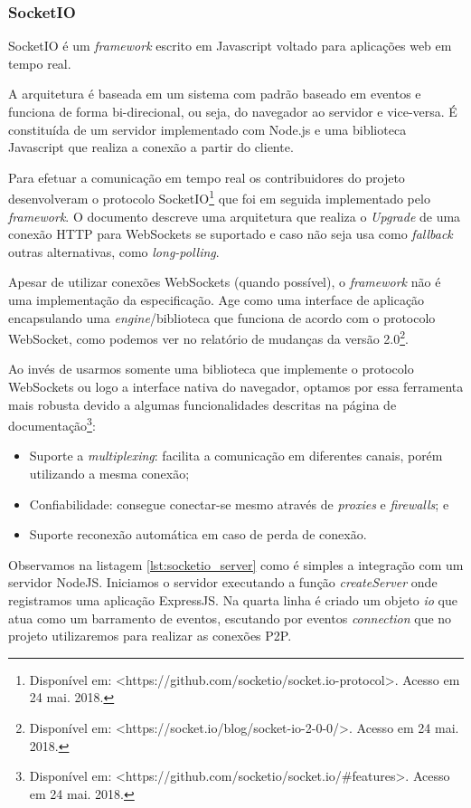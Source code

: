 \subsubsection{SocketIO}

SocketIO é um \textit{framework} escrito em Javascript voltado para aplicações web em tempo real.

A arquitetura é baseada em um sistema com padrão baseado em eventos e funciona de forma bi-direcional, ou seja, do navegador ao servidor e vice-versa. É constituída de um servidor implementado com Node.js e uma biblioteca Javascript que realiza a conexão a partir do cliente.

Para efetuar a comunicação em tempo real os contribuidores do projeto desenvolveram o protocolo SocketIO\footnote{Disponível em: <https://github.com/socketio/socket.io-protocol>. Acesso em 24 mai. 2018.} que foi em seguida implementado pelo \textit{framework}. O documento descreve uma arquitetura que realiza o \textit{Upgrade} de uma conexão HTTP para WebSockets se suportado e caso não seja usa como \textit{fallback} outras alternativas, como \textit{long-polling}.

Apesar de utilizar conexões WebSockets (quando possível), o \textit{framework} não é uma implementação da especificação. Age como uma interface de aplicação encapsulando uma \textit{engine}/biblioteca  que funciona de acordo com o protocolo WebSocket, como podemos ver no relatório de mudanças da versão 2.0\footnote{Disponível em: <https://socket.io/blog/socket-io-2-0-0/>. Acesso em 24 mai. 2018.}.

Ao invés de usarmos somente uma biblioteca que implemente o protocolo WebSockets ou logo a interface nativa do navegador, optamos por essa ferramenta mais robusta devido a algumas funcionalidades descritas na página de documentação\footnote{Disponível em: <https://github.com/socketio/socket.io/\#features>. Acesso em 24 mai. 2018.}:

\begin{itemize}
	\item Suporte a \textit{multiplexing}: facilita a comunicação em diferentes canais, porém utilizando a mesma conexão;
	\item Confiabilidade: consegue conectar-se mesmo através de \textit{proxies} e \textit{firewalls}; e
	\item Suporte reconexão automática em caso de perda de conexão.
\end{itemize}

Observamos na listagem \ref{lst:socketio_server} como é simples a integração com um servidor NodeJS. Iniciamos o servidor executando a função \textit{createServer} onde registramos uma aplicação ExpressJS. Na quarta linha é criado um objeto \textit{io} que atua como um barramento de eventos, escutando por eventos \textit{connection} que no projeto utilizaremos para realizar as conexões P2P.

